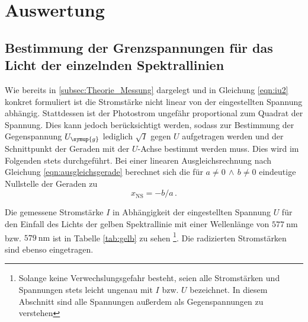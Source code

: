 \section{Auswertung}
\label{sec:Auswertung}
\subsection{Bestimmung der Grenzspannungen für das Licht der einzelnden Spektrallinien}
\label{subsec:grenzspannungen}
Wie bereits in \ref{subsec:Theorie_Messung} dargelegt und in Gleichung \eqref{eqn:iu2} konkret
formuliert ist die Stromstärke nicht linear von der eingestellten Spannung abhängig.
Stattdessen ist der Photostrom ungefähr proportional zum Quadrat der Spannung. Dies
kann jedoch berücksichtigt werden, sodass zur Bestimmung der Gegenspannung $U_{\symup{g}}$
lediglich $\sqrt{I}$ gegen $U$ aufgetragen werden und der Schnittpunkt der Geraden
mit der $U$-Achse bestimmt werden muss. Dies wird im Folgenden stets durchgeführt.
Bei einer linearen Ausgleichsrechnung nach Gleichung
\eqref{eqn:ausgleichsgerade} berechnet sich die für $a \neq 0 \, \land \, b \neq 0$ eindeutige
Nullstelle der Geraden zu
\begin{equation}
  x_\text{NS} = -b/a\,.
  \label{eqn:ns}
\end{equation}

Die gemessene Stromstärke $I$ in Abhängigkeit der eingestellten Spannung $U$ für
den Einfall des Lichts der gelben Spektrallinie mit einer Wellenlänge von $\SI{577}{\nano\meter}$
bzw. $\SI{579}{\nano\meter}$ ist in Tabelle \ref{tab:gelb} zu sehen \footnote{Solange keine Verwechslungsgefahr
besteht, seien alle Stromstärken und Spannungen stets leicht ungenau mit $I$ bzw. $U$ bezeichnet.
In diesem Abschnitt sind alle Spannungen außerdem als Gegenspannungen zu verstehen}. Die radizierten
Stromstärken sind ebenso eingetragen.

